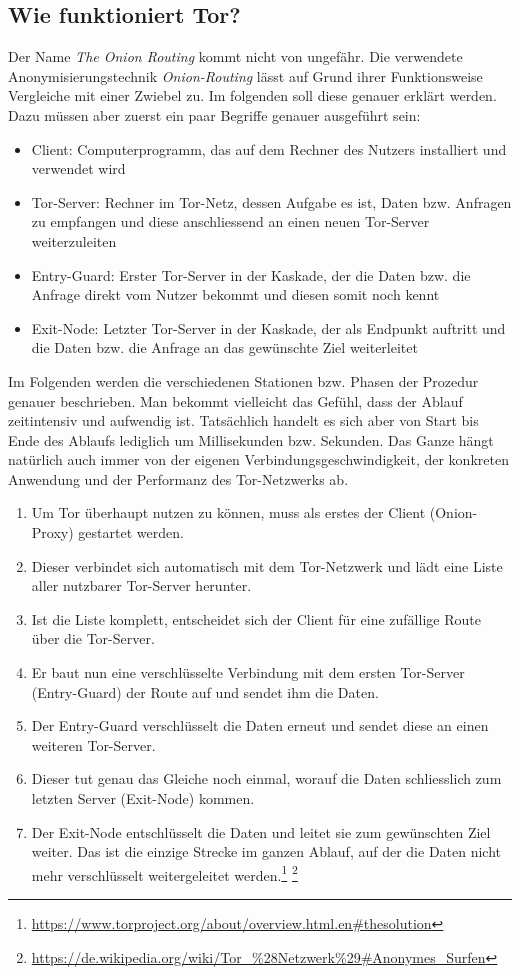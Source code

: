 \subsection{Wie funktioniert Tor?}
Der Name \textit{The Onion Routing} kommt nicht von ungefähr. Die verwendete Anonymisierungstechnik \textit{Onion-Routing} lässt auf Grund ihrer Funktionsweise Vergleiche mit einer Zwiebel zu. Im folgenden soll diese genauer erklärt werden. Dazu müssen aber zuerst ein paar Begriffe genauer ausgeführt sein:
\begin{itemize}
\item Client: Computerprogramm, das auf dem Rechner des Nutzers installiert und verwendet wird
\item Tor-Server: Rechner im Tor-Netz, dessen Aufgabe es ist, Daten bzw. Anfragen zu empfangen und diese anschliessend an einen neuen Tor-Server weiterzuleiten
\item Entry-Guard: Erster Tor-Server in der Kaskade, der die Daten bzw. die Anfrage direkt vom Nutzer bekommt und diesen somit noch kennt
\item Exit-Node: Letzter Tor-Server in der Kaskade, der als Endpunkt auftritt und die Daten bzw. die Anfrage an das gewünschte Ziel weiterleitet
\end{itemize}

Im Folgenden werden die verschiedenen Stationen bzw. Phasen der Prozedur genauer beschrieben. Man bekommt vielleicht das Gefühl, dass der Ablauf zeitintensiv und aufwendig ist. Tatsächlich handelt es sich aber von Start bis Ende des Ablaufs lediglich um Millisekunden bzw. Sekunden. Das Ganze hängt natürlich auch immer von der eigenen Verbindungsgeschwindigkeit, der konkreten Anwendung und der Performanz des Tor-Netzwerks ab.

\begin{enumerate}
\item Um Tor überhaupt nutzen zu können, muss als erstes der  Client (Onion-Proxy) gestartet werden.
\item Dieser verbindet sich automatisch mit dem Tor-Netzwerk und lädt eine Liste aller nutzbarer Tor-Server herunter.
\item Ist die Liste komplett, entscheidet sich der Client für eine zufällige Route über die Tor-Server.
\item Er baut nun eine verschlüsselte Verbindung mit dem ersten Tor-Server (Entry-Guard) der Route auf und sendet ihm die Daten.
\item Der Entry-Guard verschlüsselt die Daten erneut und sendet diese an einen weiteren Tor-Server.
\item Dieser tut genau das Gleiche noch einmal, worauf die Daten schliesslich zum letzten Server (Exit-Node) kommen.
\item Der Exit-Node entschlüsselt die Daten und leitet sie zum gewünschten Ziel weiter. Das ist die einzige Strecke im ganzen Ablauf, auf der die Daten nicht mehr verschlüsselt weitergeleitet werden.\footnote{\url{https://www.torproject.org/about/overview.html.en\#thesolution}}
\footnote{\url{https://de.wikipedia.org/wiki/Tor_\%28Netzwerk\%29\#Anonymes_Surfen}}
\end{enumerate}

